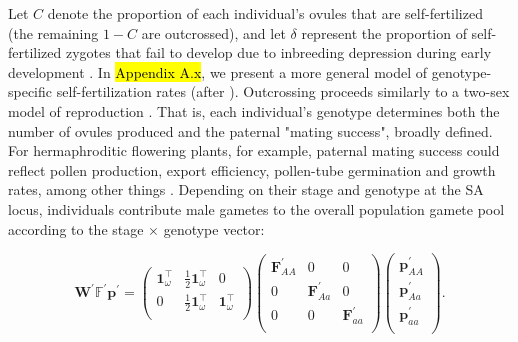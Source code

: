 \documentclass[11pt]{article}
\def\mbf#1{\mathbf{#1}}
\def\mbb#1{\mathbb{#1}}
\begin{document}
Let $C$ denote the proportion of each individual's ovules that are self-fertilized (the remaining $1 - C$ are outcrossed), and let $\delta$ represent the proportion of self-fertilized zygotes that fail to develop due to inbreeding depression during early development \citep{Charlesworth1987}. In \hl{Appendix A.x}, we present a more general model of genotype-specific self-fertilization rates (after \citealt{JordanConnallon2014}). Outcrossing proceeds similarly to a two-sex model of reproduction \citep{deVriesCaswell2019b}. That is, each individual's genotype determines both the number of ovules produced and the paternal "mating success", broadly defined. For hermaphroditic flowering plants, for example, paternal mating success could reflect pollen production, export efficiency, pollen-tube germination and growth rates, among other things \citep{LloydWebb1986, WangBarrett2020, Harder2016}. Depending on their stage and genotype at the SA locus, individuals contribute male gametes to the overall population gamete pool according to the stage $\times$ genotype vector:
\begin{linenomath*}
\begin{equation}
		\mbf{W}^{\prime} \mbb{F}^{\prime} \mbf{p}^{\prime}= 
		\left(
			\begin{array}{ccc}
				\mbf{1}^{\intercal}_{\omega} & \frac{1}{2} \mbf{1}^{\intercal}_{\omega} & 0 \\
				0 & \frac{1}{2} \mbf{1}^{\intercal}_{\omega} & \mbf{1}^{\intercal}_{\omega} \\
			\end{array} \right)
		\left(
			\begin{array}{ccc}
				\mbf{F}^{\prime}_{AA} & 0 & 0 \\
				0 & \mbf{F}^{\prime}_{Aa} & 0 \\
				0 & 0 & \mbf{F}^{\prime}_{aa} \\
			\end{array} \right)
		\left(
			\begin{array}{c}
				\mbf{p}^{\prime}_{AA} \\
				\mbf{p}^{\prime}_{Aa} \\
				\mbf{p}^{\prime}_{aa} \\
			\end{array} \right).
\end{equation}
\end{linenomath*}
\end{document}

